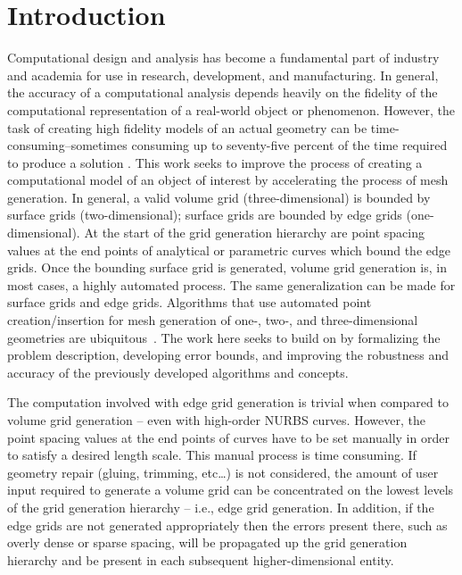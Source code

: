 \section{Introduction}
Computational design and analysis has become a fundamental part of industry and academia for use in research, development, and manufacturing. In general, the accuracy of a computational analysis depends heavily on the fidelity of the computational representation of a real-world object or phenomenon. However, the task of creating high fidelity models of an actual geometry can be time-consuming--sometimes consuming up to seventy-five percent of the time required to produce a solution \cite{bischoff05}. This work seeks to improve the process of creating a computational model of an object of interest by accelerating the process of mesh generation. In general, a valid volume grid (three-dimensional) is bounded by surface grids (two-dimensional); surface grids are bounded by edge grids (one-dimensional). At the start of the grid generation hierarchy are point spacing values at the end points of analytical or parametric curves which bound the edge grids. Once the bounding surface grid is generated, volume grid generation is, in most cases, a highly automated process. The same generalization can be made for surface grids and edge grids. Algorithms that use automated point creation/insertion for mesh generation of one-, two-, and three-dimensional geometries are ubiquitous~\cite{cubit,delaunay,aflr}.  The work here seeks to build on \cite{mclaurin12} by formalizing the problem description, developing error bounds, and improving the robustness and accuracy of the previously developed algorithms and concepts.

The computation involved with edge grid generation is trivial when 
compared to volume grid generation -- even with high-order NURBS curves. 
However, the point spacing values at the end points of curves have to be 
set manually in order to satisfy a desired length scale. This manual 
process is time consuming. If geometry repair (gluing, trimming, etc…) is 
not considered, the amount of user input required to generate a volume 
grid can be concentrated on the lowest levels of the grid generation 
hierarchy -- i.e., edge grid generation. In addition, if the edge grids 
are not generated appropriately then the errors present there, such as 
overly dense or sparse spacing, will be propagated up the grid generation hierarchy and be present in each subsequent higher-dimensional entity.

